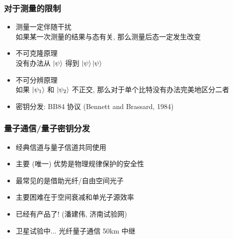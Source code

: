 \documentclass[12pt,hyperref={CJKbookmarks=true},aspectratio=169]{beamer}
\begin{document}
\begin{frame}[t]\frametitle{对于测量的限制}
\begin{itemize}
	\item 测量一定伴随干扰\\
	如果某一次测量的结果与态有关, 那么测量后态一定发生改变
	\item 不可克隆原理\\
	没有办法从 $\ket\psi$ 得到 $\ket\psi\ket\psi$
	\item 不可分辨原理\\
	如果 $\ket{\psi_1}$ 和 $\ket{\psi_2}$ 不正交, 
	那么对于单个比特没有办法完美地区分二者
	\item 密钥分发: BB84 协议 (Bennett and Brassard, 1984)
\end{itemize}
\end{frame}

\begin{frame}[t]\frametitle{量子通信/量子密钥分发}
\begin{itemize}
	\item 经典信道与量子信道共同使用
	\item 主要 (唯一) 优势是物理规律保护的安全性
	\item 最常见的是借助光纤/自由空间光子
	\item 主要困难在于空间衰减和单光子源效率
	\item 已经有产品了! (潘建伟, 济南试验网)
	\item 卫星试验中... 光纤量子通信 50km 中继
\end{itemize}
\end{frame}
\end{document}
